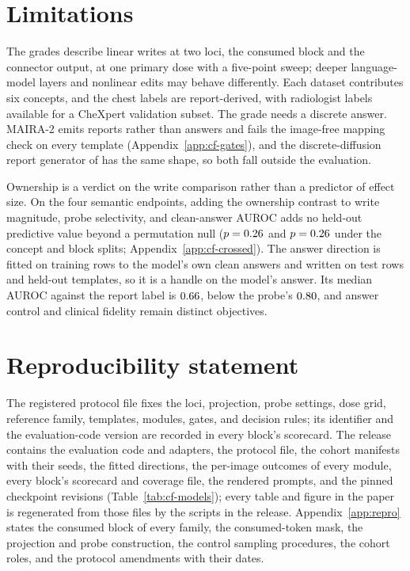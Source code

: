 \documentclass{article}
\begin{document}
\section{Limitations}
\label{sec:limitations}

The grades describe linear writes at two loci, the consumed block and the connector output, at one primary dose with a five-point sweep; deeper language-model layers and nonlinear edits may behave differently. Each dataset contributes six concepts, and the chest labels are report-derived, with radiologist labels available for a CheXpert validation subset. The grade needs a discrete answer. MAIRA-2 \citep{bannur2024maira} emits reports rather than answers and fails the image-free mapping check on every template (Appendix~\ref{app:cf-gates}), and the discrete-diffusion report generator of \citet{chen2026echo} has the same shape, so both fall outside the evaluation.

Ownership is a verdict on the write comparison rather than a predictor of effect size. On the four semantic endpoints, adding the ownership contrast to write magnitude, probe selectivity, and clean-answer AUROC adds no held-out predictive value beyond a permutation null ($p=0.26$ and $p=0.26$ under the concept and block splits; Appendix~\ref{app:cf-crossed}). The answer direction is fitted on training rows to the model's own clean answers and written on test rows and held-out templates, so it is a handle on the model's answer. Its median AUROC against the report label is $0.66$, below the probe's $0.80$, and answer control and clinical fidelity remain distinct objectives.
\section*{Reproducibility statement}
The registered protocol file fixes the loci, projection, probe settings, dose grid, reference family, templates, modules, gates, and decision rules; its identifier and the evaluation-code version are recorded in every block's scorecard. The release contains the evaluation code and adapters, the protocol file, the cohort manifests with their seeds, the fitted directions, the per-image outcomes of every module, every block's scorecard and coverage file, the rendered prompts, and the pinned checkpoint revisions (Table~\ref{tab:cf-models}); every table and figure in the paper is regenerated from those files by the scripts in the release. Appendix~\ref{app:repro} states the consumed block of every family, the consumed-token mask, the projection and probe construction, the control sampling procedures, the cohort roles, and the protocol amendments with their dates.
\end{document}

